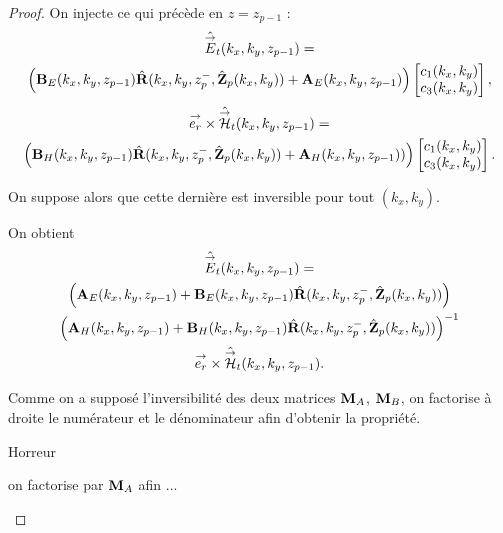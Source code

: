 \begin{proof}
      On injecte ce qui précède en \(z = z_{p-1}\) :
      \begin{multline*}
        \hat{{\overset{\rightarrow}{E}}}_t(k_x,k_y,z_{p-1}) = 
        \\
        \left(\mathbf{B}_{E}(k_x,k_y,z_{p-1})\hat{\mathbf{R}}(k_x,k_y,z_p^-,\hat{\mathbf{Z}}_p(k_x,k_y)) + \mathbf{A}_{E}(k_x,k_y,z_{p-1})\right)
        \begin{bmatrix}
          c_1(k_x,k_y) \\
          c_3(k_x,k_y)
        \end{bmatrix},
      \end{multline*}        
      \begin{multline*}
        {\overset{\rightarrow}{e_r}}\times\hat{{\overset{\rightarrow}{\mathcal{H}}}}_t(k_x,k_y,z_{p-1}) =
        \\
        \left(\mathbf{B}_{H}(k_x,k_y,z_{p-1})\hat{\mathbf{R}}(k_x,k_y,z_p^-,\hat{\mathbf{Z}}_p(k_x,k_y)) + \mathbf{A}_{H}(k_x,k_y,z_{p-1}))\right)
        \begin{bmatrix}
          c_1(k_x,k_y) \\
          c_3(k_x,k_y)
        \end{bmatrix}.
      \end{multline*}

      On suppose alors que cette dernière est inversible pour tout \((k_x,k_y)\).

      On obtient
      \begin{multline*}
        \hat{{\overset{\rightarrow}{E}}}_t(k_x,k_y,z_{p-1}) =
        \\
        \left(\mathbf{A}_{E}(k_x,k_y,z_{p-1}) + \mathbf{B}_{E}(k_x,k_y,z_{p-1})\hat{\mathbf{R}}(k_x,k_y,z_p^-,\hat{\mathbf{Z}}_p(k_x,k_y))\right) \\
        \left(\mathbf{A}_{H}(k_x,k_y,z_{p-1}) + \mathbf{B}_{H}(k_x,k_y,z_{p-1})\hat{\mathbf{R}}(k_x,k_y,z_p^-,\hat{\mathbf{Z}}_p(k_x,k_y))\right)^{-1}
        \\
        {\overset{\rightarrow}{e_r}}\times\hat{{\overset{\rightarrow}{\mathcal{H}}}}_t(k_x,k_y,z_{p-1}).
      \end{multline*}

      Comme on a supposé l'inversibilité des deux matrices \(\mathbf{M}_{A}\), \(\mathbf{M}_{B}\), on factorise à droite le numérateur et le dénominateur afin d'obtenir la propriété.
      \begin{REM}[factorise]
        Horreur
      \end{REM}
      \begin{REP}
       on factorise par \(\mathbf{M}_{A}\) afin ...
      \end{REP}
    \end{proof}

